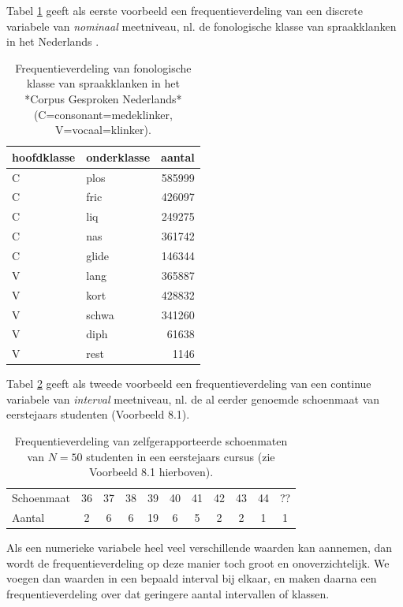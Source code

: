 \documentclass[
]{book}
\begin{document}
Tabel \ref{tab:klankfreq} geeft als eerste voorbeeld een
frequentieverdeling van een discrete variabele van \emph{nominaal}
meetniveau, nl. de fonologische klasse van spraakklanken in het
Nederlands \citep{LKCG07}.

\begin{table}

\caption{\label{tab:klankfreq}Frequentieverdeling 
              van fonologische klasse van spraakklanken 
              in het *Corpus Gesproken Nederlands* 
              (C=consonant=medeklinker, V=vocaal=klinker).}
\centering
\begin{tabular}[t]{llr}
\toprule
hoofdklasse & onderklasse & aantal\\
\midrule
C & plos & 585999\\
C & fric & 426097\\
C & liq & 249275\\
C & nas & 361742\\
C & glide & 146344\\
\addlinespace
V & lang & 365887\\
V & kort & 428832\\
V & schwa & 341260\\
V & diph & 61638\\
V & rest & 1146\\
\bottomrule
\end{tabular}
\end{table}

Tabel \ref{tab:schoenmaat} geeft als tweede voorbeeld een
frequentieverdeling van een continue variabele van \emph{interval}
meetniveau, nl. de al eerder genoemde schoenmaat van eerstejaars
studenten (Voorbeeld 8.1).

\begin{longtable}[]{@{}lcccccccccc@{}}
\caption{\label{tab:schoenmaat} Frequentieverdeling van zelfgerapporteerde schoenmaten
van \(N=50\) studenten in een eerstejaars cursus (zie
Voorbeeld 8.1 hierboven).}\tabularnewline
\toprule\noalign{}
\endfirsthead
\endhead
\bottomrule\noalign{}
\endlastfoot
Schoenmaat & 36 & 37 & 38 & 39 & 40 & 41 & 42 & 43 & 44 & ?? \\
Aantal & 2 & 6 & 6 & 19 & 6 & 5 & 2 & 2 & 1 & 1 \\
\end{longtable}

Als een numerieke variabele heel veel verschillende waarden kan
aannemen, dan wordt de frequentieverdeling op deze manier toch groot en
onoverzichtelijk. We voegen dan waarden in een bepaald interval bij
elkaar, en maken daarna een frequentieverdeling over dat geringere
aantal intervallen of klassen.
\end{document}
